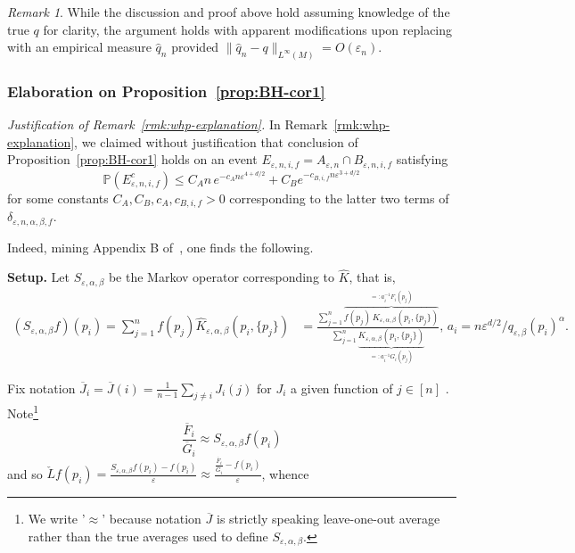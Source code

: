 \documentclass{article}
\theoremstyle{remark}
\newtheorem{remark}{Remark}
\theoremstyle{plain}
\begin{document}
\begin{remark}
While the discussion and proof above hold assuming knowledge of the true \( q \) for clarity, the argument holds with apparent modifications upon replacing with an empirical measure \( \hat{q} _{n}\) provided \( \| \hat{q} _{n}- q\|_{L^\infty(M)}=O(\varepsilon_{n}) \).
\end{remark}





\subsubsection{Elaboration on Proposition~\ref{prop:BH-cor1}}
\label{subsubsec:the-bh-good-event}
\textit{Justification of Remark~\ref{rmk:whp-explanation}.} In Remark~\ref{rmk:whp-explanation}, we claimed without justification that conclusion of Proposition~\ref{prop:BH-cor1} holds on an event $E_{\varepsilon, n, i , f}=A_{\varepsilon, n} \cap B_{\varepsilon, n, i ,f}$ satisfying
\begin{equation}
\mathbb{P}(E_{\varepsilon, n, i, f}^{c}) \leq C_A n  \, e^{- c_{A}n \varepsilon^{4+ d/ 2}}+C_{B}e^{-c_{B,i, f}n \varepsilon^{3+d/2}}
\end{equation}
{for some constants $C_{A},C_{B},c_{A},c_{B,i, f}>0$ corresponding to the latter two terms of \( \delta_{\varepsilon, n, \alpha, \beta, f} \).}

Indeed, mining Appendix B of~\cite{Berry2016}, one finds the following.

\textbf{Setup.} Let \( S_{\varepsilon, \alpha, \beta} \) be the Markov operator corresponding to \( \hat{K} \), that is, \begin{align}
(S_{\varepsilon, \alpha, \beta} f)(p_{i})=\sum_{j=1}^{n} f(p_{j}) \hat{K}_{\varepsilon, \alpha, \beta}(p_{i}, \{ p_{j} \})&=\frac{\sum_{j=1}^n \overbrace{f(p_j)\,K_{\varepsilon,\alpha,\beta}(p_i,\{p_j\})}^{=: a_i^{-1} F_i(p_j)}}{\sum_{j=1}^n \underbrace{K_{\varepsilon,\alpha,\beta}(p_i,\{p_j\})}_{=: a_i ^{-1}G_i(p_j)}},  \, a_{i}= n \varepsilon ^{d/2} /  q_{\varepsilon, \beta}(p_{i})^\alpha.
\end{align}

Fix notation  $\overline{J}_{i} = \overline{J}(i)= \frac{1}{n-1} \sum_{j \neq i}J_{i}(j)$ for \( J_{i}\) a given function of \( j \in [n] \) . Note\footnote{We write '$\approx$' because notation $\overline{J}$ is strictly speaking leave-one-out average rather than the true averages used to define $S_{\varepsilon, \alpha, \beta}$. } 
$$\frac{\overline{F}_{i}}{\overline{G}_{i}}\approx S_{\varepsilon, \alpha, \beta }f (p_{i})$$
and so $\check{L}f(p_{i})=\frac{S_{\varepsilon, \alpha, \beta}f(p_{i})-f(p_{i})}{\varepsilon} \approx  \frac{\frac{\overline{F}_{i}}{\overline{G}_{i}}- f(p_{i})}{\varepsilon}$, whence
\end{document}

